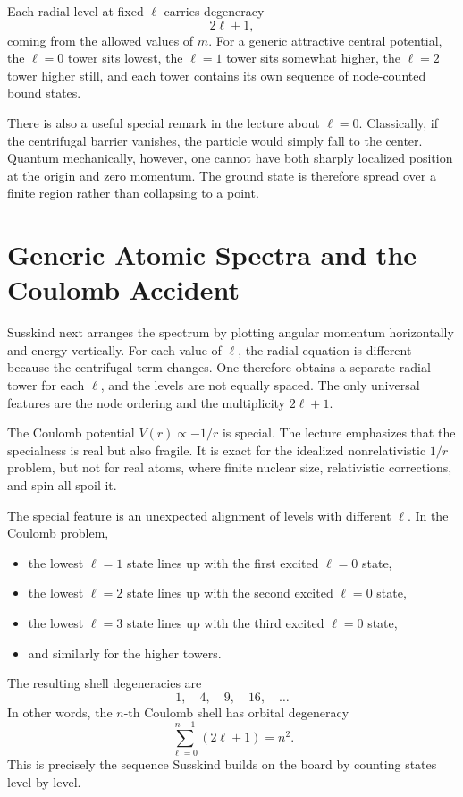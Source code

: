Each radial level at fixed \(\ell\) carries degeneracy
\begin{equation}
2\ell+1,
\end{equation}
coming from the allowed values of \(m\). For a generic attractive central potential, the \(\ell=0\) tower sits lowest, the \(\ell=1\) tower sits somewhat higher, the \(\ell=2\) tower higher still, and each tower contains its own sequence of node-counted bound states.

There is also a useful special remark in the lecture about \(\ell=0\). Classically, if the centrifugal barrier vanishes, the particle would simply fall to the center. Quantum mechanically, however, one cannot have both sharply localized position at the origin and zero momentum. The ground state is therefore spread over a finite region rather than collapsing to a point.

\section{Generic Atomic Spectra and the Coulomb Accident}

Susskind next arranges the spectrum by plotting angular momentum horizontally and energy vertically. For each value of \(\ell\), the radial equation is different because the centrifugal term changes. One therefore obtains a separate radial tower for each \(\ell\), and the levels are not equally spaced. The only universal features are the node ordering and the multiplicity \(2\ell+1\).

The Coulomb potential \(V(r)\propto -1/r\) is special. The lecture emphasizes that the specialness is real but also fragile. It is exact for the idealized nonrelativistic \(1/r\) problem, but not for real atoms, where finite nuclear size, relativistic corrections, and spin all spoil it.

The special feature is an unexpected alignment of levels with different \(\ell\). In the Coulomb problem,
\begin{itemize}
\item the lowest \(\ell=1\) state lines up with the first excited \(\ell=0\) state,
\item the lowest \(\ell=2\) state lines up with the second excited \(\ell=0\) state,
\item the lowest \(\ell=3\) state lines up with the third excited \(\ell=0\) state,
\item and similarly for the higher towers.
\end{itemize}
The resulting shell degeneracies are
\begin{equation}
1,\quad 4,\quad 9,\quad 16,\quad \dots
\end{equation}
In other words, the \(n\)-th Coulomb shell has orbital degeneracy
\begin{equation}
\sum_{\ell=0}^{n-1}(2\ell+1)=n^2.
\end{equation}
This is precisely the sequence Susskind builds on the board by counting states level by level.

